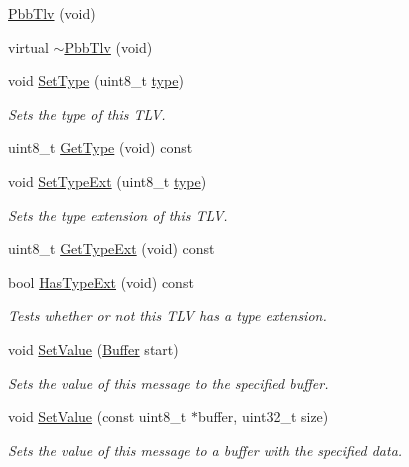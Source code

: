 \begin{DoxyCompactItemize}
\item 
\hyperlink{classns3_1_1PbbTlv_abe0c3744aced2d820c125d67b6c787d6}{Pbb\+Tlv} (void)
\item 
virtual \hyperlink{classns3_1_1PbbTlv_ae55ca5336b8d39315b5cb0597c5fe399}{$\sim$\+Pbb\+Tlv} (void)
\item 
void \hyperlink{classns3_1_1PbbTlv_a90a0452018ed364ac37c3ad116dd718b}{Set\+Type} (uint8\+\_\+t \hyperlink{visualizer-ideas_8txt_add98db9e15e2a58cf2b57623e7aa893a}{type})
\begin{DoxyCompactList}\small\item\em Sets the type of this T\+LV. \end{DoxyCompactList}\item 
uint8\+\_\+t \hyperlink{classns3_1_1PbbTlv_a2a44832293fdd80640da9bf24d82b2ff}{Get\+Type} (void) const 
\item 
void \hyperlink{classns3_1_1PbbTlv_aebc3df25cac008223fda7d3954c17638}{Set\+Type\+Ext} (uint8\+\_\+t \hyperlink{visualizer-ideas_8txt_add98db9e15e2a58cf2b57623e7aa893a}{type})
\begin{DoxyCompactList}\small\item\em Sets the type extension of this T\+LV. \end{DoxyCompactList}\item 
uint8\+\_\+t \hyperlink{classns3_1_1PbbTlv_a9ab192074bd17f19b3a812d11175154b}{Get\+Type\+Ext} (void) const 
\item 
bool \hyperlink{classns3_1_1PbbTlv_ad575ee9c8a0cc8e5fc89d45e38f653ab}{Has\+Type\+Ext} (void) const 
\begin{DoxyCompactList}\small\item\em Tests whether or not this T\+LV has a type extension. \end{DoxyCompactList}\item 
void \hyperlink{classns3_1_1PbbTlv_a1ca7d32f9b68990225f3267c2cc09f11}{Set\+Value} (\hyperlink{classns3_1_1Buffer}{Buffer} start)
\begin{DoxyCompactList}\small\item\em Sets the value of this message to the specified buffer. \end{DoxyCompactList}\item 
void \hyperlink{classns3_1_1PbbTlv_aaf48b2b695845f0a747dff11370c393e}{Set\+Value} (const uint8\+\_\+t $\ast$buffer, uint32\+\_\+t size)
\begin{DoxyCompactList}\small\item\em Sets the value of this message to a buffer with the specified data. \end{DoxyCompactList}\item 

\end{DoxyCompactItemize}
